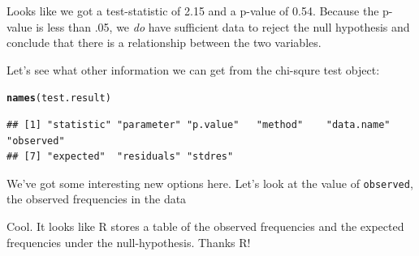 \documentclass{tufte-book}\usepackage[]{graphicx}\usepackage[]{color}
\makeatletter
\newcommand{\hlopt}[1]{\textcolor[rgb]{0,0,0}{#1}}%
\newcommand{\hlstd}[1]{\textcolor[rgb]{0.345,0.345,0.345}{#1}}%
\newcommand{\hlkwd}[1]{\textcolor[rgb]{0.737,0.353,0.396}{\textbf{#1}}}%
\newenvironment{kframe}{%
 \def\at@end@of@kframe{}%
 \ifinner\ifhmode%
  \def\at@end@of@kframe{\end{minipage}}%
  \begin{minipage}{\columnwidth}%
 \fi\fi%
 \def\FrameCommand##1{\hskip\@totalleftmargin \hskip-\fboxsep
 \colorbox{shadecolor}{##1}\hskip-\fboxsep
     \hskip-\linewidth \hskip-\@totalleftmargin \hskip\columnwidth}%
 \MakeFramed {\advance\hsize-\width
   \@totalleftmargin\z@ \linewidth\hsize
   \@setminipage}}%
 {\par\unskip\endMakeFramed%
 \at@end@of@kframe}
\newenvironment{knitrout}{}{} %
\makeatother
\begin{document}
Looks like we got a test-statistic of 2.15 and a p-value of 0.54. Because the p-value is less than .05, we \textit{do} have sufficient data to reject the null hypothesis and conclude that there is a relationship between the two variables.

Let's see what other information we can get from the chi-squre test object:


\begin{footnotesize}
\begin{knitrout}
\color{fgcolor}\begin{kframe}
\begin{alltt}
\hlkwd{names}\hlstd{(test.result)}
\end{alltt}
\begin{verbatim}
## [1] "statistic" "parameter" "p.value"   "method"    "data.name" "observed" 
## [7] "expected"  "residuals" "stdres"
\end{verbatim}
\end{kframe}
\end{knitrout}
\end{footnotesize}

We've got some interesting new options here. Let's look at the value of \texttt{observed}, the observed frequencies in the data


Cool. It looks like R stores a table of the observed frequencies and the expected frequencies under the null-hypothesis. Thanks R!
\end{document}
